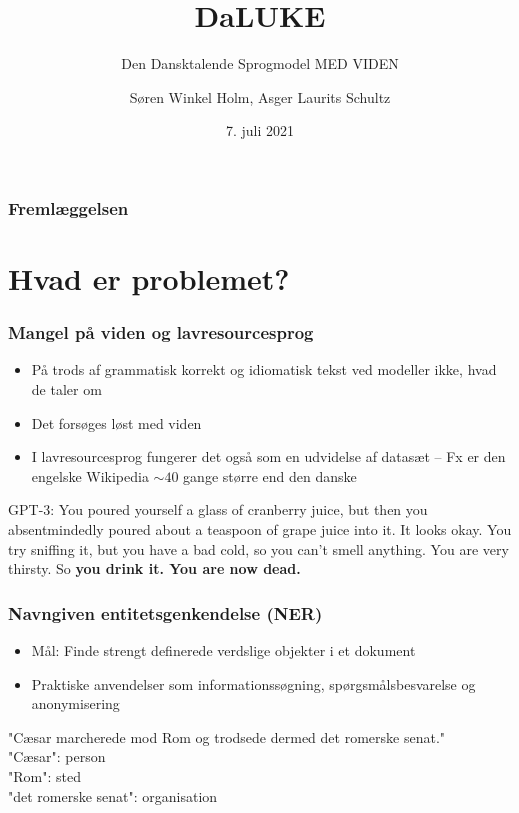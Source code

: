 \documentclass{beamer}
\title{DaLUKE}
\subtitle{
    Den Dansktalende Sprogmodel MED VIDEN
}
\author[Søren Holm, Asger Schultz]{Søren Winkel Holm, Asger Laurits Schultz}
\institute[DTU]{Danmarks Tekniske Universitet}
\date{7. juli 2021}
\begin{document}
\begin{frame}
    \titlepage
\end{frame}



\begin{frame}
    \frametitle{Fremlæggelsen}
    \footnotesize
    \tableofcontents
\end{frame}

\section{Hvad er problemet?}
\begin{frame}
    \frametitle{Mangel på viden og lavresourcesprog}
    \begin{itemize}
        \item På trods af grammatisk korrekt og idiomatisk tekst ved modeller ikke, hvad de taler om\footnotemark
        \item Det forsøges løst med viden
        \item I lavresourcesprog fungerer det også som en udvidelse af datasæt -- Fx er den engelske Wikipedia $ \sim 40 $ gange større end den danske
    \end{itemize}
    \begin{example}
        \footnotesize
        GPT-3: You poured yourself a glass of cranberry juice, but then you absentmindedly poured about a teaspoon of grape juice into it. It looks okay. You try sniffing it, but you have a bad cold, so you can’t smell anything. You are very thirsty. So \textbf{you drink it. You are now dead.}
    \end{example}
\end{frame}

\begin{frame}
    \frametitle{Navngiven entitetsgenkendelse (NER)}
    \begin{itemize}
        \item Mål: Finde strengt definerede verdslige objekter i et dokument
        \item Praktiske anvendelser som informationssøgning, spørgsmålsbesvarelse og anonymisering
    \end{itemize}
    \begin{example}
        \footnotesize
        "Cæsar marcherede mod Rom og trodsede dermed det romerske senat."\\
        "Cæsar": person\\
        "Rom": sted\\
        "det romerske senat": organisation
    \end{example}
\end{frame}
\end{document}
